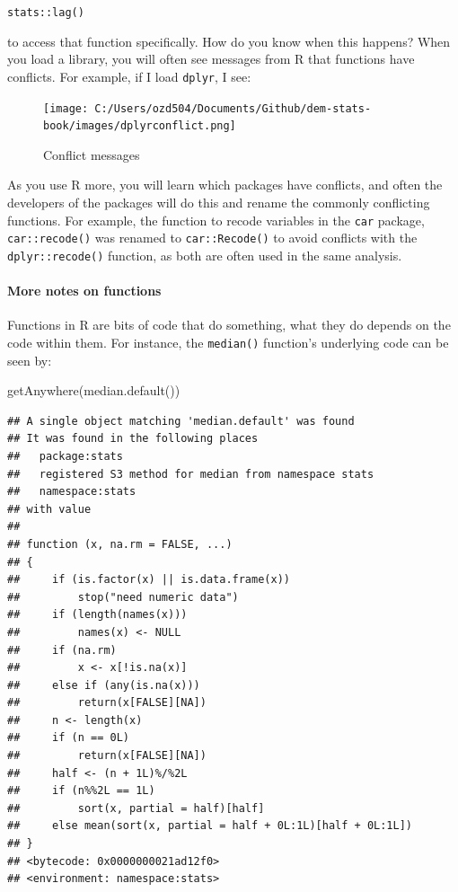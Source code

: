 \documentclass[
]{article}
\newenvironment{Shaded}{\begin{snugshade}}{\end{snugshade}}
\newcommand{\FunctionTok}[1]{\textcolor[rgb]{0.00,0.00,0.00}{#1}}
\newcommand{\NormalTok}[1]{#1}
\begin{document}
\texttt{stats::lag()}

to access that function specifically. How do you know when this happens?
When you load a library, you will often see messages from R that
functions have conflicts. For example, if I load \texttt{dplyr}, I see:

\begin{figure}
\centering
\texttt{[image: C:/Users/ozd504/Documents/Github/dem-stats-book/images/dplyrconflict.png]}
\caption{Conflict
messages}
\end{figure}

As you use R more, you will learn which packages have conflicts, and
often the developers of the packages will do this and rename the
commonly conflicting functions. For example, the function to recode
variables in the \texttt{car} package, \texttt{car::recode()} was renamed to
\texttt{car::Recode()} to avoid conflicts with the \texttt{dplyr::recode()} function,
as both are often used in the same analysis.

\hypertarget{more-notes-on-functions}{%
\paragraph{More notes on functions}\label{more-notes-on-functions}}

Functions in R are bits of code that do something, what they do depends
on the code within them. For instance, the \texttt{median()} function's
underlying code can be seen by:

\begin{Shaded}
\begin{Highlighting}[]
\FunctionTok{getAnywhere}\NormalTok{(}\FunctionTok{median.default}\NormalTok{())}
\end{Highlighting}
\end{Shaded}

\begin{verbatim}
## A single object matching 'median.default' was found
## It was found in the following places
##   package:stats
##   registered S3 method for median from namespace stats
##   namespace:stats
## with value
## 
## function (x, na.rm = FALSE, ...) 
## {
##     if (is.factor(x) || is.data.frame(x)) 
##         stop("need numeric data")
##     if (length(names(x))) 
##         names(x) <- NULL
##     if (na.rm) 
##         x <- x[!is.na(x)]
##     else if (any(is.na(x))) 
##         return(x[FALSE][NA])
##     n <- length(x)
##     if (n == 0L) 
##         return(x[FALSE][NA])
##     half <- (n + 1L)%/%2L
##     if (n%%2L == 1L) 
##         sort(x, partial = half)[half]
##     else mean(sort(x, partial = half + 0L:1L)[half + 0L:1L])
## }
## <bytecode: 0x0000000021ad12f0>
## <environment: namespace:stats>
\end{verbatim}
\end{document}

